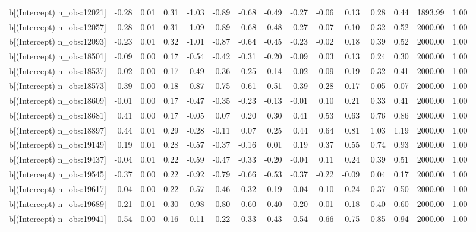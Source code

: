 \begin{table}[ht]
\begin{tabular}{rrrrrrrrrrrrrrr}
  b[(Intercept) n\_obs:12021] & -0.28 & 0.01 & 0.31 & -1.03 & -0.89 & -0.68 & -0.49 & -0.27 & -0.06 & 0.13 & 0.28 & 0.44 & 1893.99 & 1.00 \\ 
  b[(Intercept) n\_obs:12057] & -0.28 & 0.01 & 0.31 & -1.09 & -0.89 & -0.68 & -0.48 & -0.27 & -0.07 & 0.10 & 0.32 & 0.52 & 2000.00 & 1.00 \\ 
  b[(Intercept) n\_obs:12093] & -0.23 & 0.01 & 0.32 & -1.01 & -0.87 & -0.64 & -0.45 & -0.23 & -0.02 & 0.18 & 0.39 & 0.52 & 2000.00 & 1.00 \\ 
  b[(Intercept) n\_obs:18501] & -0.09 & 0.00 & 0.17 & -0.54 & -0.42 & -0.31 & -0.20 & -0.09 & 0.03 & 0.13 & 0.24 & 0.30 & 2000.00 & 1.00 \\ 
  b[(Intercept) n\_obs:18537] & -0.02 & 0.00 & 0.17 & -0.49 & -0.36 & -0.25 & -0.14 & -0.02 & 0.09 & 0.19 & 0.32 & 0.41 & 2000.00 & 1.00 \\ 
  b[(Intercept) n\_obs:18573] & -0.39 & 0.00 & 0.18 & -0.87 & -0.75 & -0.61 & -0.51 & -0.39 & -0.28 & -0.17 & -0.05 & 0.07 & 2000.00 & 1.00 \\ 
  b[(Intercept) n\_obs:18609] & -0.01 & 0.00 & 0.17 & -0.47 & -0.35 & -0.23 & -0.13 & -0.01 & 0.10 & 0.21 & 0.33 & 0.41 & 2000.00 & 1.00 \\ 
  b[(Intercept) n\_obs:18681] & 0.41 & 0.00 & 0.17 & -0.05 & 0.07 & 0.20 & 0.30 & 0.41 & 0.53 & 0.63 & 0.76 & 0.86 & 2000.00 & 1.00 \\ 
  b[(Intercept) n\_obs:18897] & 0.44 & 0.01 & 0.29 & -0.28 & -0.11 & 0.07 & 0.25 & 0.44 & 0.64 & 0.81 & 1.03 & 1.19 & 2000.00 & 1.00 \\ 
  b[(Intercept) n\_obs:19149] & 0.19 & 0.01 & 0.28 & -0.57 & -0.37 & -0.16 & 0.01 & 0.19 & 0.37 & 0.55 & 0.74 & 0.93 & 2000.00 & 1.00 \\ 
  b[(Intercept) n\_obs:19437] & -0.04 & 0.01 & 0.22 & -0.59 & -0.47 & -0.33 & -0.20 & -0.04 & 0.11 & 0.24 & 0.39 & 0.51 & 2000.00 & 1.00 \\ 
  b[(Intercept) n\_obs:19545] & -0.37 & 0.00 & 0.22 & -0.92 & -0.79 & -0.66 & -0.53 & -0.37 & -0.22 & -0.09 & 0.04 & 0.17 & 2000.00 & 1.00 \\ 
  b[(Intercept) n\_obs:19617] & -0.04 & 0.00 & 0.22 & -0.57 & -0.46 & -0.32 & -0.19 & -0.04 & 0.10 & 0.24 & 0.37 & 0.50 & 2000.00 & 1.00 \\ 
  b[(Intercept) n\_obs:19689] & -0.21 & 0.01 & 0.30 & -0.98 & -0.80 & -0.60 & -0.40 & -0.20 & -0.01 & 0.18 & 0.40 & 0.60 & 2000.00 & 1.00 \\ 
  b[(Intercept) n\_obs:19941] & 0.54 & 0.00 & 0.16 & 0.11 & 0.22 & 0.33 & 0.43 & 0.54 & 0.66 & 0.75 & 0.85 & 0.94 & 2000.00 & 1.00 \\ 

\end{tabular}
\end{table}
